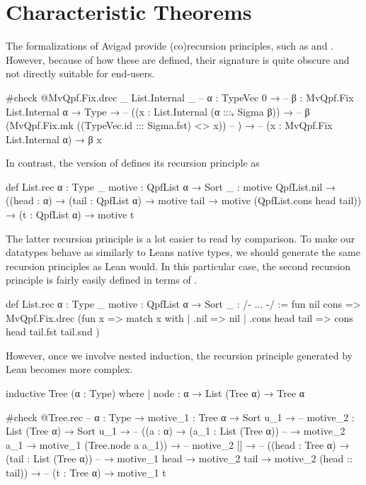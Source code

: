 \section{Characteristic Theorems}

The formalizations of Avigad \etal{} provide (co)recursion principles, such as  and .
However, because of how these are defined, their signature is quite obscure and not directly suitable for end-users.
\begin{leancode}
  #check @MvQpf.Fix.drec _ List.Internal _
  -- {α : TypeVec 0} →
  --   {β : MvQpf.Fix List.Internal α → Type} →
  --     ((x : List.Internal (α :::ᵥ Sigma β)) → 
  --        β (MvQpf.Fix.mk ((TypeVec.id ::: Sigma.fst) <$$> x))
  --     ) →
  --       (x : MvQpf.Fix List.Internal α) → β x
\end{leancode}

In contrast, the \inductive{} version of  defines its recursion principle as
\begin{leancode}
  def List.rec {α : Type _} {motive : QpfList α → Sort _} :
  motive QpfList.nil 
    → ((head : α) → (tail : QpfList α) → motive tail 
                                          → motive (QpfList.cons head tail))
    → (t : QpfList α) 
    → motive t
\end{leancode}

The latter recursion principle is a lot easier to read by comparison. To make our datatypes behave as similarly to Leans native
\inductive{} types, we should generate the same recursion principles as Lean would.
In this particular case, the second recursion principle is fairly easily defined in terms of .
\begin{leancode}
  def List.rec {α : Type _} {motive : QpfList α → Sort _} : /- ... -/ :=
    fun nil cons => MvQpf.Fix.drec (fun x => 
      match x with
      | .nil            => nil
      | .cons head tail => cons head tail.fst tail.snd
    )
\end{leancode}

However, once we involve nested induction, the recursion principle generated by Lean becomes more complex.

\begin{leancode}
  inductive Tree (α : Type) where
  | node : α → List (Tree α) → Tree α

  #check @Tree.rec
  -- {α : Type} → {motive_1 : Tree α → Sort u_1} →
  --   {motive_2 : List (Tree α) → Sort u_1} →
  --   ((a : α) → (a_1 : List (Tree α)) 
  --        → motive_2 a_1 → motive_1 (Tree.node a a_1)) →
  --   motive_2 [] →
  --   ((head : Tree α) → (tail : List (Tree α)) 
  --        → motive_1 head → motive_2 tail → motive_2 (head :: tail)) →
  --   (t : Tree α) → motive_1 t
\end{leancode}


